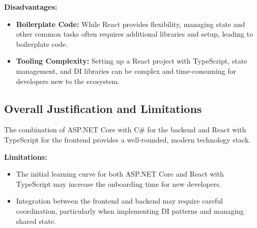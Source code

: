 \textbf{Disadvantages:}
\begin{itemize}
    \item \textbf{Boilerplate Code:} While React provides flexibility, managing state and other common tasks often requires additional libraries and setup, leading to boilerplate code.
    \item \textbf{Tooling Complexity:} Setting up a React project with TypeScript, state management, and DI libraries can be complex and time-consuming for developers new to the ecosystem.
\end{itemize}

\subsection{Overall Justification and Limitations}
The combination of ASP.NET Core with C\# for the backend and React with TypeScript for the frontend provides a well-rounded, modern technology stack. 

\textbf{Limitations:}
\begin{itemize}
    \item The initial learning curve for both ASP.NET Core and React with TypeScript may increase the onboarding time for new developers.
    \item Integration between the frontend and backend may require careful coordination, particularly when implementing DI patterns and managing shared state.
\end{itemize}
